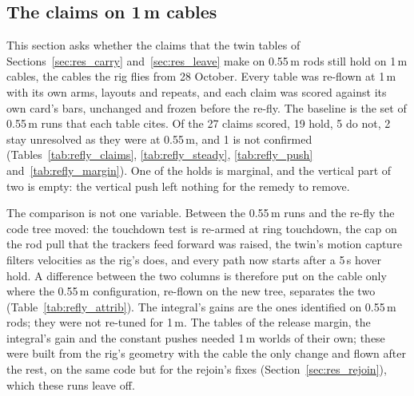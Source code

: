 
\subsection{The claims on \texorpdfstring{1\,m}{1 m} cables}
\label{sec:res_refly}

This section asks whether the claims that the twin tables of Sections~\ref{sec:res_carry} and~\ref{sec:res_leave}
make on 0.55\,m rods still hold on 1\,m cables, the cables the rig flies from 28 October. Every table was re-flown at
1\,m with its own arms, layouts and repeats, and each claim was scored against its own card's bars, unchanged and
frozen before the re-fly. The baseline is the set of 0.55\,m runs that each table cites. Of the 27 claims scored, 19
hold, 5 do not, 2 stay unresolved as they were at 0.55\,m, and 1 is not confirmed (Tables~\ref{tab:refly_claims},
\ref{tab:refly_steady}, \ref{tab:refly_push} and~\ref{tab:refly_margin}). One of the holds is marginal, and the vertical part of two is
empty: the vertical push left nothing for the remedy to remove.

The comparison is not one variable. Between the 0.55\,m runs and the re-fly the code tree moved: the touchdown test
is re-armed at ring touchdown, the cap on the rod pull that the trackers feed forward was raised, the twin's motion
capture filters velocities as the rig's does, and every path now starts after a 5\,s hover hold. A difference between
the two columns is therefore put on the cable only where the 0.55\,m configuration, re-flown on the new tree,
separates the two (Table~\ref{tab:refly_attrib}). The integral's gains are the ones identified on 0.55\,m rods; they
were not re-tuned for 1\,m. The tables of the release margin, the integral's gain and the constant pushes needed 1\,m
worlds of their own; these were built from the rig's geometry with the cable the only change and flown after the rest,
on the same code but for the rejoin's fixes (Section~\ref{sec:res_rejoin}), which these runs leave off.

